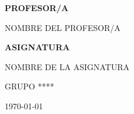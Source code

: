 \documentclass[12pt,a4paper]{article}                           %
\begin{document}
\begin{titlepage}
    \vfill                                                          %
    {\bfseries\Large PROFESOR/A \par}                               %
    \vspace{0.3cm}                                                  %
    {\large NOMBRE DEL PROFESOR/A \par}                             %

    \vfill                                                          %
    {\bfseries\Large ASIGNATURA \par}
    \vspace{0.3cm}                                                  %
    {\large NOMBRE DE LA ASIGNATURA \par}                           %

    \vfill                                                          %
    {\Large GRUPO **** \par}                                        %

    \vfill                                                          %
    {\Large \today \par}                                            %

\end{titlepage}
\end{document}

